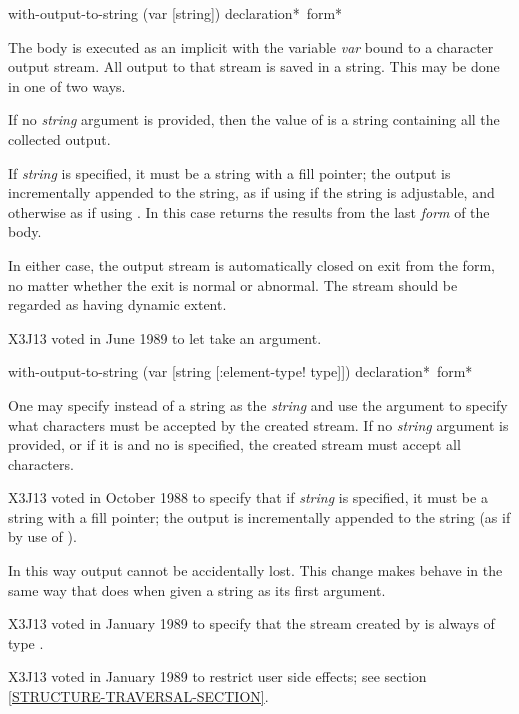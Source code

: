 \begin{obsolete}
\begin{defmac}
with-output-to-string (var [string]) {declaration}* {\,form}*

The body is executed as an implicit  with the variable \emph{var}
bound to a character output stream.  All output to that stream
is saved in a string.  This may be done in one of two ways.

If no \emph{string} argument is provided, then
the value of
 is a string containing all the collected output.

If \emph{string} is specified, it must be a string with a fill pointer;
the output is incrementally appended to the string,
as if using  if the string is adjustable,
and otherwise as if using .
In this case 
returns the results from the last \emph{form} of the body.

In either case,
the output stream is automatically closed on exit from
the  form,
no matter whether the exit is normal or abnormal.
The stream should be regarded as having dynamic extent.
\end{defmac}
\end{obsolete}

\begin{newer}
X3J13 voted in June 1989 
to let  take an  argument.

\begin{defmac}
with-output-to-string (var [string [\!:element-type! type]])
                      {declaration}* {\,form}*

One may specify  instead of a string as the \emph{string}
and use the  argument to specify what characters
must be accepted by the created stream.  If no \emph{string} argument
is provided, or if it is  and no  is specified,
the created stream must accept all characters.

X3J13 voted in October 1988
to specify that
if \emph{string} is specified, it must be a string with a fill pointer;
the output is incrementally appended to the string (as if by use of
).

In this way output cannot be accidentally lost.  This change makes
 behave in the same way that  does
when given a string as its first argument.

X3J13 voted in January 1989
to specify that the stream created by
 is always of type .

X3J13 voted in January 1989
to restrict user side effects; see section \ref{STRUCTURE-TRAVERSAL-SECTION}.
\end{defmac}
\end{newer}

